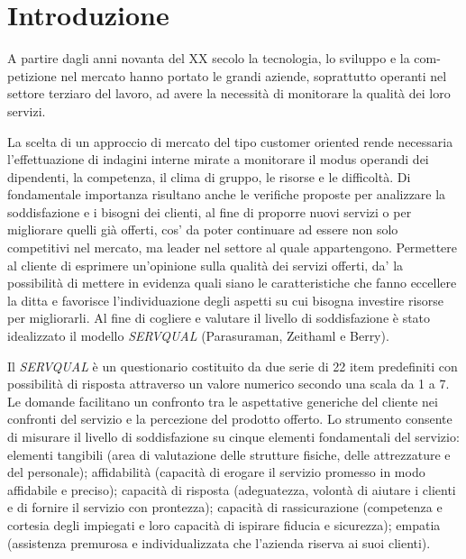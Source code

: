 \section{Introduzione}
A partire dagli anni novanta del XX secolo la tecnologia, lo sviluppo e la com-
petizione nel mercato hanno portato le grandi aziende, soprattutto operanti nel
settore terziaro del lavoro, ad avere la necessità di monitorare la qualità dei
loro servizi.

La scelta di un approccio di mercato del tipo customer oriented rende
necessaria l’effettuazione di indagini interne mirate a monitorare il modus
operandi dei dipendenti, la competenza, il clima di gruppo, le risorse e le
difficoltà. Di fondamentale importanza risultano anche le verifiche proposte per
analizzare la soddisfazione e i bisogni dei clienti, al fine di proporre nuovi
servizi o per migliorare quelli già offerti, cos' da poter continuare ad essere
non solo competitivi nel mercato, ma leader nel settore al quale appartengono.
Permettere al cliente di esprimere un’opinione sulla qualità dei servizi
offerti, da' la possibilità di mettere in evidenza quali siano le
caratteristiche che fanno eccellere la ditta e favorisce l’individuazione degli
aspetti su cui bisogna investire risorse per migliorarli.
Al fine di cogliere e valutare il livello di soddisfazione è stato idealizzato
il modello \emph{SERVQUAL} (Parasuraman, Zeithaml e Berry). 

Il \emph{SERVQUAL} è un
questionario costituito da due serie di 22 item predefiniti con possibilità di
risposta attraverso un valore numerico secondo una scala da 1 a 7. Le domande
facilitano un confronto tra le aspettative generiche del cliente nei confronti
del servizio e la percezione del prodotto offerto.
Lo strumento consente di misurare il livello di soddisfazione su cinque elementi
fondamentali del servizio: elementi tangibili  (area di valutazione delle
strutture fisiche, delle attrezzature e del personale); affidabilità (capacità
di erogare il servizio promesso in modo affidabile e preciso); capacità di
risposta (adeguatezza, volontà di aiutare i clienti e di fornire il servizio con
prontezza); capacità di rassicurazione (competenza e cortesia degli impiegati e
loro capacità di ispirare fiducia e sicurezza); empatia (assistenza premurosa e
individualizzata che l’azienda riserva ai suoi clienti).

